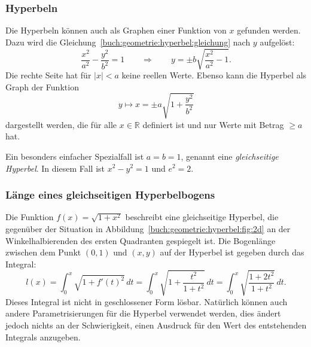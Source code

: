 %
%
\subsubsection{Hyperbeln}
Die Hyperbeln können auch als Graphen einer Funktion von $x$ gefunden werden.
Dazu wird die Gleichung~\eqref{buch:geometrie:hyperbel:gleichung}
nach $y$ aufgelöst:
\[
\frac{x^2}{a^2}
-
\frac{y^2}{b^2}
=
1
\qquad\Rightarrow\qquad
y
=
\pm
b\sqrt{\frac{x^2}{a^2}-1}.
\]
Die rechte Seite hat für $|x|<a$ keine reellen Werte.
Ebenso kann die Hyperbel als Graph der Funktion
\[
y\mapsto x = \pm a\sqrt{1+\frac{y^2}{b^2}}
\]
dargestellt werden, die für alle $x\in\mathbb{R}$ definiert ist und
nur Werte mit Betrag $\ge a$ hat.

Ein besonders einfacher Spezialfall ist $a=b=1$, genannt eine
{\em gleichseitige Hyperbel}.
%
%
In diesem Fall ist $x^2-y^2=1$ und $e^2=2$.

%
%
\subsubsection{Länge eines gleichseitigen Hyperbelbogens}
Die Funktion $f(x)=\sqrt{1+x^2}$ beschreibt eine gleichseitige
Hyperbel, die gegenüber der Situation in
Abbildung~\ref{buch:geometrie:hyperbel:fig:2d}
an der Winkelhalbierenden des ersten Quadranten gespiegelt ist.
Die Bogenlänge zwischen dem Punkt $(0,1)$ und $(x,y)$ auf der
Hyperbel ist gegeben durch das Integral:
\[
l(x)
=
\int_0^x \sqrt{1+f'(t)^2}\,dt
=
\int_0^x \sqrt{1+\frac{t^2}{1+t^2}}\,dt
=
\int_0^x \sqrt{\frac{1+2t^2}{1+t^2}}\,dt.
\]
Dieses Integral ist nicht in geschlossener Form lösbar.
Natürlich können auch andere Parametrisierungen für die Hyperbel
verwendet werden, dies ändert jedoch
nichts an der Schwierigkeit, einen Ausdruck für den Wert des
entstehenden Integrals anzugeben.

%
%
